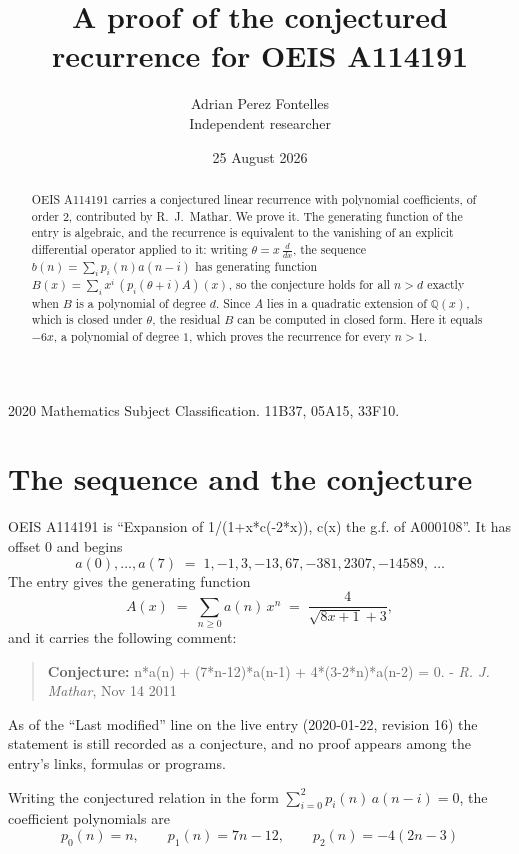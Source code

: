 \documentclass[11pt,a4paper]{article}
\title{A proof of the conjectured recurrence for OEIS A114191}
\author{Adrian Perez Fontelles\\ \small Independent researcher}
\date{25 August 2026}
\theoremstyle{plain}
\theoremstyle{definition}
\begin{document}
\maketitle

\begin{abstract}
OEIS A114191 carries a conjectured linear recurrence with polynomial coefficients, of
order 2, contributed by R.~J.~Mathar. We prove it. The generating function of the
entry is algebraic, and the recurrence is equivalent to the vanishing of an explicit
differential operator applied to it: writing $\theta=x\,\frac{d}{dx}$, the sequence
$b(n)=\sum_{i}p_{i}(n)a(n-i)$ has generating function
$B(x)=\sum_{i}x^{i}\,(p_{i}(\theta+i)A)(x)$, so the conjecture holds for all $n>d$ exactly
when $B$ is a polynomial of degree $d$. Since $A$ lies in a quadratic extension of
$\mathbb{Q}(x)$, which is closed under $\theta$, the residual $B$ can be computed in
closed form. Here it equals $- 6 x$, a polynomial of degree $1$, which proves
the recurrence for every $n>1$.
\end{abstract}

\noindent\small 2020 Mathematics Subject Classification. 11B37, 05A15, 33F10.\normalsize

\section{The sequence and the conjecture}

OEIS A114191 is ``Expansion of 1/(1+x*c(-2*x)), c(x) the g.f. of A000108''. It has offset $0$ and begins
\[
a(0),\dots,a(7)\;=\;1, -1, 3, -13, 67, -381, 2307, -14589,\ \dots
\]
The entry gives the generating function
\begin{equation}\label{eq:gf}
A(x)\;=\;\sum_{n\ge 0} a(n)\,x^{n}\;=\;\frac{4}{\sqrt{8 x + 1} + 3} ,
\end{equation}
and it carries the following comment:
\begin{quote}\small
\textbf{Conjecture:} n*a(n) + (7*n-12)*a(n-1) + 4*(3-2*n)*a(n-2) = 0. - \emph{R. J. Mathar}, Nov 14 2011
\end{quote}
As of the ``Last modified'' line on the live entry (2020-01-22, revision 16) the
statement is still recorded as a conjecture, and no proof appears among the entry's links,
formulas or programs.

Writing the conjectured relation in the form $\sum_{i=0}^{2}p_{i}(n)\,a(n-i)=0$,
the coefficient polynomials are
\[
p_{0}(n)=n,\qquad p_{1}(n)=7 n - 12,\qquad p_{2}(n)=- 4 \left(2 n - 3\right)
\]
\end{document}
